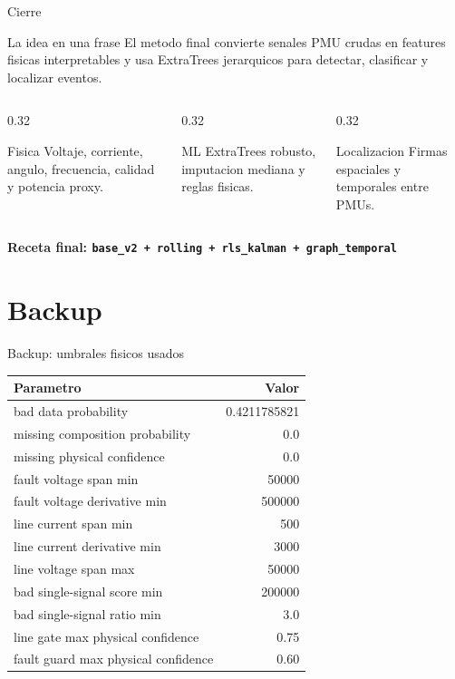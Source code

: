\documentclass[10pt,aspectratio=169]{beamer}
\newcommand{\code}[1]{\texttt{\footnotesize #1}}
\begin{document}
\begin{frame}{Cierre}
\small
\begin{block}{La idea en una frase}
El metodo final convierte senales PMU crudas en features fisicas interpretables y usa ExtraTrees jerarquicos para detectar, clasificar y localizar eventos.
\end{block}
\begin{columns}[T,totalwidth=\textwidth]
\begin{column}{0.32\textwidth}
\begin{exampleblock}{Fisica}
Voltaje, corriente, angulo, frecuencia, calidad y potencia proxy.
\end{exampleblock}
\end{column}
\begin{column}{0.32\textwidth}
\begin{exampleblock}{ML}
ExtraTrees robusto, imputacion mediana y reglas fisicas.
\end{exampleblock}
\end{column}
\begin{column}{0.32\textwidth}
\begin{exampleblock}{Localizacion}
Firmas espaciales y temporales entre PMUs.
\end{exampleblock}
\end{column}
\end{columns}
\vspace{3mm}
\centering
{\Large\bfseries Receta final: \code{base\_v2 + rolling + rls\_kalman + graph\_temporal}}
\end{frame}

\appendix
\section{Backup}

\begin{frame}{Backup: umbrales fisicos usados}
\small
\centering
\begin{tabular}{lr}
\toprule
\textbf{Parametro} & \textbf{Valor}\\
\midrule
bad data probability & 0.4211785821\\
missing composition probability & 0.0\\
missing physical confidence & 0.0\\
fault voltage span min & 50000\\
fault voltage derivative min & 500000\\
line current span min & 500\\
line current derivative min & 3000\\
line voltage span max & 50000\\
bad single-signal score min & 200000\\
bad single-signal ratio min & 3.0\\
line gate max physical confidence & 0.75\\
fault guard max physical confidence & 0.60\\
\bottomrule
\end{tabular}
\end{frame}
\end{document}
